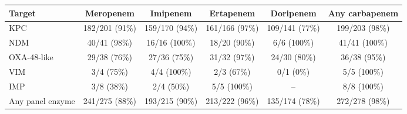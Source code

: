\begin{tabular}{lccccc}
\hline\hline
Target & Meropenem & Imipenem & Ertapenem & Doripenem & Any carbapenem \\
\hline
KPC & 182/201 (91\%) & 159/170 (94\%) & 161/166 (97\%) & 109/141 (77\%) & 199/203 (98\%) \\
NDM & 40/41 (98\%) & 16/16 (100\%) & 18/20 (90\%) & 6/6 (100\%) & 41/41 (100\%) \\
OXA-48-like & 29/38 (76\%) & 27/36 (75\%) & 31/32 (97\%) & 24/30 (80\%) & 36/38 (95\%) \\
VIM & 3/4 (75\%) & 4/4 (100\%) & 2/3 (67\%) & 0/1 (0\%) & 5/5 (100\%) \\
IMP & 3/8 (38\%) & 2/4 (50\%) & 5/5 (100\%) & -- & 8/8 (100\%) \\
Any panel enzyme & 241/275 (88\%) & 193/215 (90\%) & 213/222 (96\%) & 135/174 (78\%) & 272/278 (98\%) \\
\hline\hline
\end{tabular}
